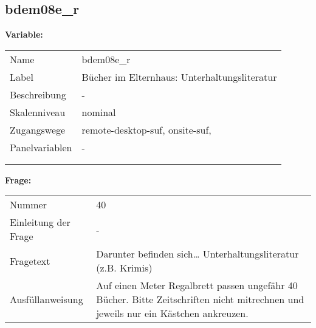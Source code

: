 	
	
	\subsection{bdem08e\_r}
	\label{subSection:bdem08e_r}

	\noindent\textbf{Variable:}\\
		\begin{tabular}{lL{11.3cm}}
			\label{tableVariable:bdem08e_r}
			Name & bdem08e\_r \\
			Label & Bücher im Elternhaus: Unterhaltungsliteratur \\
			Beschreibung & - \\
			Skalenniveau & nominal \\
			Zugangswege &
				remote-desktop-suf,
				onsite-suf,
 \\
			Panelvariablen & -
			 \\
			 \\
 \\
		\end{tabular}

		\vspace*{1 cm}
		\noindent\textbf{Frage:}\\
		\begin{tabular}{lL{11.3cm}}
			\label{tableQuestion:bdem08e_r}
			Nummer & 40 \\
			Einleitung der Frage & - \\
			Fragetext & Darunter befinden sich…
Unterhaltungsliteratur (z.B. Krimis) \\
			Ausfüllanweisung & Auf einen Meter Regalbrett passen ungefähr 40 Bücher. Bitte Zeitschriften nicht mitrechnen und jeweils nur ein Kästchen ankreuzen. \\
		\end{tabular}





